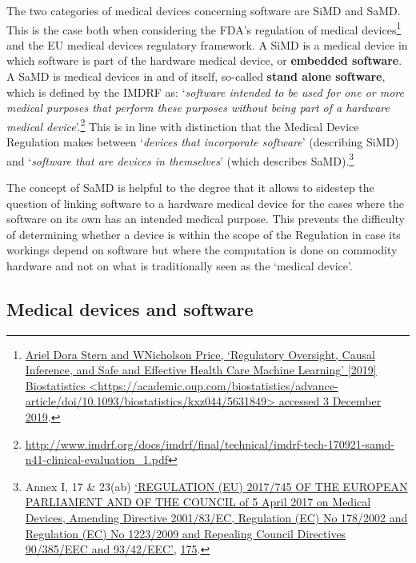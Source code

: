\documentclass[
]{scrartcl}
\begin{document}
The two categories of medical devices concerning software are SiMD and SaMD. This is the case both when considering the FDA's regulation of medical devices\footnote{\protect\hyperlink{ref-sternRegulatoryOversightCausal2019a}{Ariel Dora Stern and WNicholson Price, {`Regulatory {Oversight}, {Causal Inference}, and {Safe} and {Effective Health Care Machine Learning}'} {[}2019{]} Biostatistics \textless{}\url{https://academic.oup.com/biostatistics/advance-article/doi/10.1093/biostatistics/kxz044/5631849}\textgreater{} accessed 3 December 2019}.} and the EU medical devices regulatory framework. A SiMD is a medical device in which software is part of the hardware medical device, or \textbf{embedded software}. A SaMD is medical devices in and of itself, so-called \textbf{stand alone software}, which is defined by the IMDRF as: `\emph{software intended to be used for one or more medical purposes that perform these purposes without being part of a hardware medical device}'.\footnote{\url{http://www.imdrf.org/docs/imdrf/final/technical/imdrf-tech-170921-samd-n41-clinical-evaluation_1.pdf}} This is in line with distinction that the Medical Device Regulation makes between `\emph{devices that incorporate software}' (describing SiMD) and `\emph{software that are devices in themselves}' (which describes SaMD).\footnote{Annex I, 17 \& 23(ab) \protect\hyperlink{ref-REGULATIONEU2017a}{{`{REGULATION} ({EU}) 2017/745 {OF THE EUROPEAN PARLIAMENT AND OF THE COUNCIL} of 5 {April} 2017 on Medical Devices, Amending {Directive} 2001/83/{EC}, {Regulation} ({EC}) {No} 178/2002 and {Regulation} ({EC}) {No} 1223/2009 and Repealing {Council Directives} 90/385/{EEC} and 93/42/{EEC}'}}, \protect\hyperlink{ref-REGULATIONEU2017a}{175}.}

The concept of SaMD is helpful to the degree that it allows to sidestep the question of linking software to a hardware medical device for the cases where the software on its own has an intended medical purpose. This prevents the difficulty of determining whether a device is within the scope of the Regulation in case its workings depend on software but where the computation is done on commodity hardware and not on what is traditionally seen as the `medical device'.

\hypertarget{medical-devices-and-software}{%
\subsection{Medical devices and software}\label{medical-devices-and-software}}
\end{document}
